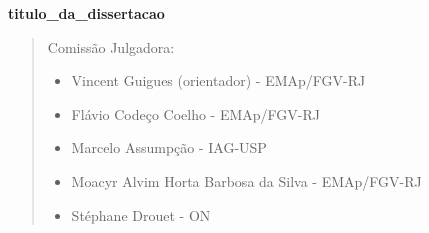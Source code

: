 \documentclass[12pt,twoside,a4paper]{book}
\numberwithin{equation}{section}
\begin{document}




%
%
%
%
\newpage
\thispagestyle{empty}
     \begin{center}
         \vspace*{2.3 cm}
         \textbf{\Large{\glsdesc*{titulo_da_dissertacao}}}\\
         \vspace*{2 cm}
     \end{center}
% 
     \vskip 2cm
% 
     \begin{flushright}
% 
     \vskip 2cm
% 
     \end{flushright}
     \vskip 4.2cm
% 
     \begin{quote}
     \noindent Comissão Julgadora:
%     
     \begin{itemize}
 		\item Vincent Guigues (orientador) - EMAp/FGV-RJ 
 		\item Flávio Codeço Coelho - EMAp/FGV-RJ 
 		\item Marcelo Assumpção - IAG-USP 
 		\item Moacyr Alvim Horta Barbosa da Silva - EMAp/FGV-RJ 
 		\item Stéphane Drouet - ON 
     \end{itemize}
%       
     \end{quote}
 \pagebreak
\end{document}
